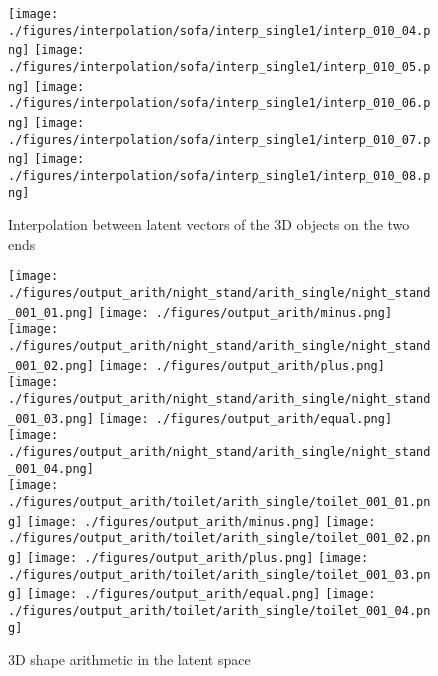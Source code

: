 \documentclass[10pt,twocolumn,letterpaper]{article}
\begin{document}
\begin{figure*}
\begin{minipage}[b]{.64\textwidth}
	\texttt{[image: ./figures/interpolation/sofa/interp\_single1/interp\_010\_04.png]} \hspace{-1.7mm}  
	\texttt{[image: ./figures/interpolation/sofa/interp\_single1/interp\_010\_05.png]} \hspace{-1.7mm} 
	\texttt{[image: ./figures/interpolation/sofa/interp\_single1/interp\_010\_06.png]} \hspace{-1.7mm} 
	\texttt{[image: ./figures/interpolation/sofa/interp\_single1/interp\_010\_07.png]} \hspace{-1.7mm} 
	\texttt{[image: ./figures/interpolation/sofa/interp\_single1/interp\_010\_08.png]}
  \caption{Interpolation between latent vectors of the 3D objects on the two ends}
  \label{fig:interpolation}
\end{minipage}
\end{figure*}


\begin{figure}
	\centering
	\texttt{[image: ./figures/output\_arith/night\_stand/arith\_single/night\_stand\_001\_01.png]} 
	\texttt{[image: ./figures/output\_arith/minus.png]} 
	\texttt{[image: ./figures/output\_arith/night\_stand/arith\_single/night\_stand\_001\_02.png]} \hspace{-2mm}
	\texttt{[image: ./figures/output\_arith/plus.png]} 
	\texttt{[image: ./figures/output\_arith/night\_stand/arith\_single/night\_stand\_001\_03.png]} 
	\texttt{[image: ./figures/output\_arith/equal.png]} 
	\texttt{[image: ./figures/output\_arith/night\_stand/arith\_single/night\_stand\_001\_04.png]} \hspace{-3mm}	\\
	\texttt{[image: ./figures/output\_arith/toilet/arith\_single/toilet\_001\_01.png]} \hspace{-3mm}
	\texttt{[image: ./figures/output\_arith/minus.png]} 
	\texttt{[image: ./figures/output\_arith/toilet/arith\_single/toilet\_001\_02.png]} \hspace{-2mm}
	\texttt{[image: ./figures/output\_arith/plus.png]} 
	\texttt{[image: ./figures/output\_arith/toilet/arith\_single/toilet\_001\_03.png]} 
	\texttt{[image: ./figures/output\_arith/equal.png]} 
	\texttt{[image: ./figures/output\_arith/toilet/arith\_single/toilet\_001\_04.png]}  \hspace{-3mm}
	\caption{3D shape arithmetic in the latent space}
	\label{fig:arith}
\end{figure}	
\end{document}
